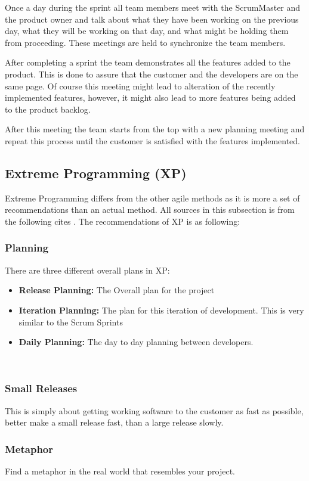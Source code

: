 Once a day during the sprint all team members meet with the ScrumMaster and the product owner and talk about what they have been working on the previous day, what they will be working on that day, and what might be holding them from proceeding. These meetings are held to synchronize the team members.

After completing a sprint the team demonstrates all the features added to the product. This is done to assure that the customer and the developers are on the same page.
Of course this meeting might lead to alteration of the recently implemented features, however, it might also lead to more features being added to the product backlog.

After this meeting the team starts from the top with a new planning meeting and repeat this process until the customer is satisfied with the features implemented.

\subsection{Extreme Programming (XP)}
Extreme Programming differs from the other agile methods as it is more a set of recommendations than an actual method. All sources in this subsection is from the following cites \cite{xp, xp2}.
The recommendations of XP is as following:

\subsubsection{Planning}
There are three different overall plans in XP:
\begin{itemize}
	\item \textbf{Release Planning:} The Overall plan for the project
	\item \textbf{Iteration Planning:} The plan for this iteration of development. This is very similar to the Scrum Sprints
	\item \textbf{Daily Planning:} The day to day planning between developers.
\end{itemize}
\ \\
\subsubsection{Small Releases}
This is simply about getting working software to the customer as fast as possible, better make a small release fast, than a large release slowly.

\subsubsection{Metaphor}
Find a metaphor in the real world that resembles your project.

